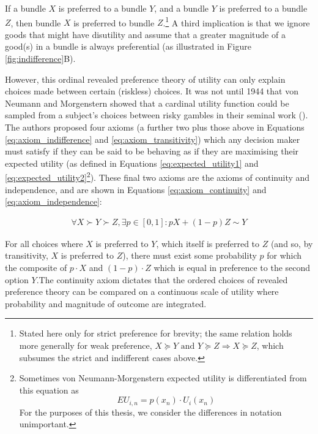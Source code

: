 If a bundle $X$ is preferred to a bundle $Y$, and a bundle $Y$ is preferred to a bundle $Z$, then bundle $X$ is preferred to bundle $Z$.\footnote{Stated here only for strict preference for brevity; the same relation holds more generally for weak preference, $X \succeq Y \text{ and } Y \succeq Z \Rightarrow X \succeq Z$, which subsumes the strict and indifferent cases above.} A third implication is that we ignore goods that might have disutility and assume that a greater magnitude of a good(s) in a bundle is always preferential (as illustrated in Figure \ref{fig:indifference}B).

However, this ordinal revealed preference theory of utility can only explain choices made between certain (riskless) choices. It was not until 1944 that von Neumann and Morgenstern showed that a cardinal utility function could be sampled from a subject's choices between risky gambles in their seminal work (\cite{vonNeumann1944}). The authors proposed four axioms (a further two plus those above in Equations \ref{eq:axiom_indifference} and \ref{eq:axiom_transitivity}) which any decision maker must satisfy if they can be said to be behaving as if they are maximising their expected utility (as defined in Equations \ref{eq:expected_utility1} and \ref{eq:expected_utility2}\footnote{Sometimes von Neumann-Morgenstern expected utility is differentiated from this equation as
$$EU_{i,n} = p(x_n) \cdot U_i(x_n)$$
For the purposes of this thesis, we consider the differences in notation unimportant.}). These final two axioms are the axioms of continuity and independence, and are shown in Equations \ref{eq:axiom_continuity} and \ref{eq:axiom_independence}:

\begin{equation}
\begin{aligned}
\forall X \succ Y \succ Z, \exists p \in [0,1]: pX + (1-p)Z \sim Y
\label{eq:axiom_continuity}
\end{aligned}
\end{equation}

For all choices where $X$ is preferred to $Y$, which itself is preferred to $Z$ (and so, by transitivity, $X$ is preferred to $Z$), there must exist some probability $p$ for which the composite of $p \cdot X$ and $(1-p) \cdot Z$ which is equal in preference to the second option $Y$.The continuity axiom dictates that the ordered choices of revealed preference theory can be compared on a continuous scale of utility where probability and magnitude of outcome are integrated.

